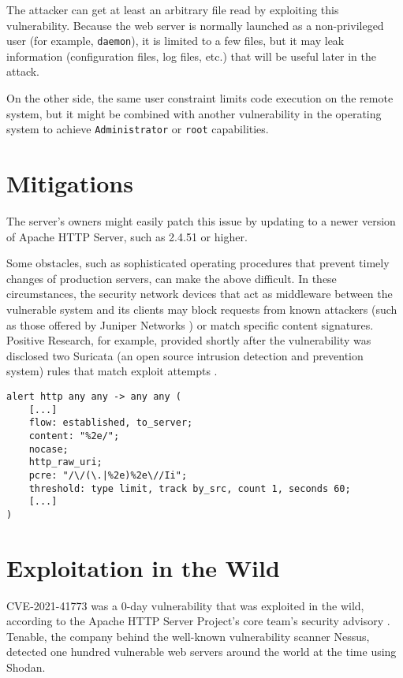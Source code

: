 \documentclass[12pt,a4paper,english,onecolumn]{IEEEtran}
\begin{document}
The attacker can get at least an arbitrary file read by exploiting this vulnerability. Because the web server is normally launched as a non-privileged user (for example, \texttt{daemon}), it is limited to a few files, but it may leak information (configuration files, log files, etc.) that will be useful later in the attack.

On the other side, the same user constraint limits code execution on the remote system, but it might be combined with another vulnerability in the operating system to achieve \texttt{Administrator} or \texttt{root} capabilities.

\section{Mitigations}

The server's owners might easily patch this issue by updating to a newer version of Apache HTTP Server, such as 2.4.51 or higher.

Some obstacles, such as sophisticated operating procedures that prevent timely changes of production servers, can make the above difficult. In these circumstances, the security network devices that act as middleware between the vulnerable system and its clients may block requests from known attackers (such as those offered by Juniper Networks \cite{juniper}) or match specific content signatures. Positive Research, for example, provided shortly after the vulnerability was disclosed two Suricata (an open source intrusion detection and prevention system) rules that match exploit attempts \cite{pt_ruleset}.

\vspace{0.3cm}

\begin{verbatim}
alert http any any -> any any (
    [...]
    flow: established, to_server;
    content: "%2e/";
    nocase;
    http_raw_uri;
    pcre: "/\/(\.|%2e)%2e\//Ii";
    threshold: type limit, track by_src, count 1, seconds 60;
    [...]
)
\end{verbatim}

\vspace{0.3cm}

\section{Exploitation in the Wild}

CVE-2021-41773 was a 0-day vulnerability that was exploited in the wild, according to the Apache HTTP Server Project's core team's security advisory \cite{apache_vulns}. Tenable, the company behind the well-known vulnerability scanner Nessus, detected one hundred vulnerable web servers around the world at the time using Shodan.
\end{document}
